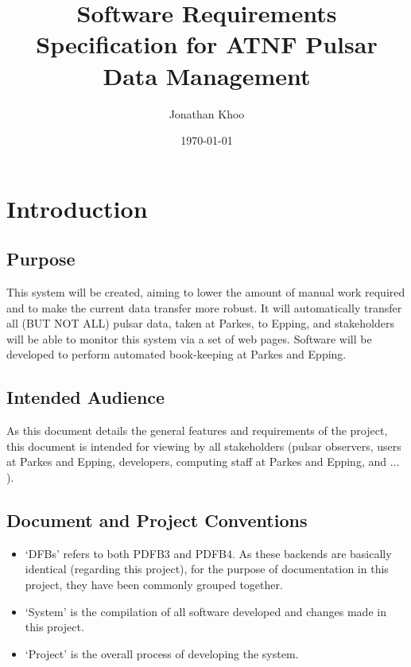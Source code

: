 \documentclass[a4paper,11pt]{article}
\begin{document}
\title{Software Requirements Specification for ATNF Pulsar Data Management}
\author{Jonathan Khoo}
\date{\today}
\maketitle
\clearpage

\section{Introduction}


\subsection{Purpose}
This system will be created, aiming to lower the amount of manual work required and to make the current data transfer more robust. It will automatically transfer all (BUT NOT ALL) pulsar data, taken at Parkes, to Epping, and stakeholders will be able to monitor this system via a set of web pages. Software will be developed to perform automated book-keeping at Parkes and Epping.

\subsection{Intended Audience}
As this document details the general features and requirements of the project, this document is intended for viewing by all stakeholders (pulsar observers, users at Parkes and Epping, developers, computing staff at Parkes and Epping, and ... ).

\subsection{Document and Project Conventions}
\begin{itemize}
\item `DFBs' refers to both PDFB3 and PDFB4. As these backends are basically identical (regarding this project), for the purpose of documentation in this project, they have been commonly grouped together.
\item `System' is the compilation of all software developed and changes made in this project.
\item `Project' is the overall process of developing the system.
\end{itemize}
\end{document}
